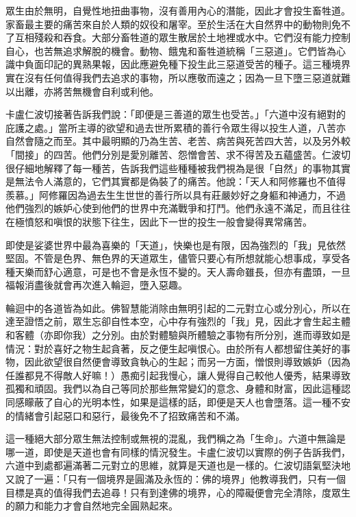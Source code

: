 眾生由於無明，自覺性地扭曲事物，沒有善用內心的潛能，因此才會投生畜牲道。家畜最主要的痛苦來自於人類的奴役和屠宰。至於生活在大自然界中的動物則免不了互相殘殺和吞食。大部分畜牲道的眾生散居於土地裡或水中。它們沒有能力控制自心，也苦無追求解脫的機會。動物、餓鬼和畜牲道統稱「三惡道」。它們皆為心識中負面印記的異熟果報，因此應避免種下投生此三惡道受苦的種子。這三種境界實在沒有任何值得我們去追求的事物，所以應敬而遠之；因為一旦下墮三惡道就難以出離，亦將苦無機會自利或利他。

卡盧仁波切接著告訴我們說：「即便是三善道的眾生也受苦。」「六道中沒有絕對的庇護之處。」當所主導的欲望和過去世所累積的善行令眾生得以投生人道，八苦亦自然會隨之而至。其中最明顯的乃為生苦、老苦、病苦與死苦四大苦，以及另外較「間接」的四苦。他們分別是愛別離苦、怨憎會苦、求不得苦及五蘊盛苦。仁波切很仔細地解釋了每一種苦，告訴我們這些種種被我們視為是很「自然」的事物其實是無法令人滿意的，它們其實都是偽裝了的痛苦。他說：「天人和阿修羅也不值得羨慕。」阿修羅因為過去生生世世的善行所以具有莊嚴妙好之身軀和神通力，不過他們強烈的嫉妒心使到他們的世界中充滿戰爭和打鬥。他們永遠不滿足，而且往往在極憤怒和嗔恨的狀態下往生，因此下一世的投生一般會變得異常痛苦。


即使是娑婆世界中最為喜樂的「天道」，快樂也是有限，因為強烈的「我」見依然堅固。不管是色界、無色界的天道眾生，儘管只要心有所想就能心想事成，享受各種天樂而舒心適意，可是也不會是永恆不變的。天人壽命雖長，但亦有盡頭，一旦福報消盡後就會再次進入輪迴，墮入惡趣。

輪迴中的各道皆為如此。佛智慧能消除由無明引起的二元對立心或分別心，所以在達至證悟之前，眾生忘卻自性本空，心中存有強烈的「我」見，因此才會生起主體和客體（亦即你我）之分別。由於對體驗與所體驗之事物有所分別，進而導致如是情況：對於喜好之物生起貪著，反之便生起嗔恨心。由於所有人都想留住美好的事物，因此欲望很自然便會導致貪執心的生起；而另一方面，憎恨則導致嫉妒（因為任誰都見不得敵人好嘛！）愚痴引起我慢心，讓人覺得自己較他人優秀，結果導致孤獨和頑固。我們以為自己等同於那些無常變幻的意念、身體和財富，因此這種認同感矇蔽了自心的光明本性，如果是這樣的話，即便是天人也會墮落。這一種不安的情緒會引起惡口和惡行，最後免不了招致痛苦和不滿。

這一種絕大部分眾生無法控制或無視的混亂，我們稱之為「生命」。六道中無論是哪一道，即使是天道也會有同樣的情況發生。卡盧仁波切以實際的例子告訴我們，六道中到處都遍滿著二元對立的思維，就算是天道也是一樣的。仁波切語氣堅決地又說了一遍：「只有一個境界是圓滿及永恆的：佛的境界」他教導我們，只有一個目標是真的值得我們去追尋！只有到達佛的境界，心的障礙便會完全清除，度眾生的願力和能力才會自然地完全圓熟起來。

